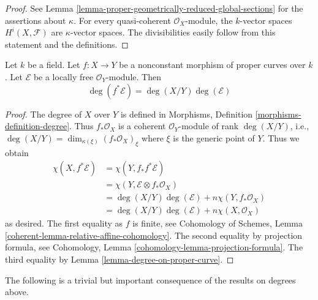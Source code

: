 \begin{proof}
See Lemma \ref{lemma-proper-geometrically-reduced-global-sections}
for the assertions about $\kappa$.
For every quasi-coherent $\mathcal{O}_X$-module, the
$k$-vector spaces $H^i(X, \mathcal{F})$ are $\kappa$-vector spaces.
The divisibilities easily follow from this statement and the
definitions.
\end{proof}

\begin{lemma}
\label{lemma-degree-pullback-map-proper-curves}
Let $k$ be a field. Let $f : X \to Y$ be a nonconstant morphism of
proper curves over $k$. Let $\mathcal{E}$ be a locally free
$\mathcal{O}_Y$-module. Then
$$
\deg(f^*\mathcal{E}) = \deg(X/Y) \deg(\mathcal{E})
$$
\end{lemma}

\begin{proof}
The degree of $X$ over $Y$ is defined in
Morphisms, Definition \ref{morphisms-definition-degree}.
Thus $f_*\mathcal{O}_X$ is a coherent $\mathcal{O}_Y$-module
of rank $\deg(X/Y)$, i.e.,
$\deg(X/Y) = \dim_{\kappa(\xi)} (f_*\mathcal{O}_X)_\xi$ where $\xi$
is the generic point of $Y$. Thus we obtain
\begin{align*}
\chi(X, f^*\mathcal{E})
& =
\chi(Y, f_*f^*\mathcal{E}) \\
& =
\chi(Y, \mathcal{E} \otimes f_*\mathcal{O}_X) \\
& =
\deg(X/Y) \deg(\mathcal{E}) + n \chi(Y, f_*\mathcal{O}_X) \\
& =
\deg(X/Y) \deg(\mathcal{E}) + n \chi(X, \mathcal{O}_X)
\end{align*}
as desired. The first equality as $f$ is finite, see
Cohomology of Schemes, Lemma \ref{coherent-lemma-relative-affine-cohomology}.
The second equality by projection formula, see
Cohomology, Lemma \ref{cohomology-lemma-projection-formula}.
The third equality by Lemma \ref{lemma-degree-on-proper-curve}.
\end{proof}

\noindent
The following is a trivial but important consequence of the
results on degrees above.

